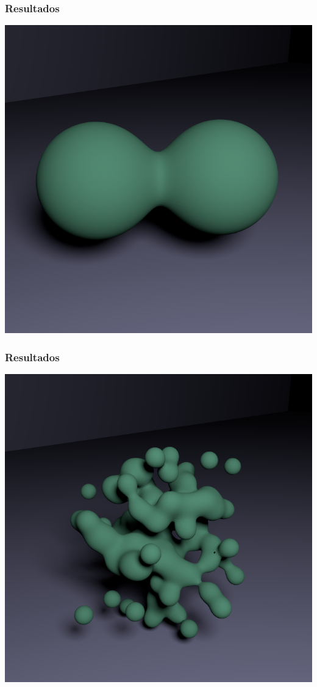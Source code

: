 \documentclass[brazil]{beamer}
\begin{document}
      \begin{frame}
        \frametitle{Resultados}
        \begin{center}
          \includegraphics[width=.6\textwidth]{imgs/metaball-good1.png}
        \end{center}
      \end{frame}
  
      \begin{frame}
        \frametitle{Resultados}
        \begin{center}
          \includegraphics[width=.6\textwidth]{imgs/blob.png}
        \end{center}
      \end{frame}
\end{document}
